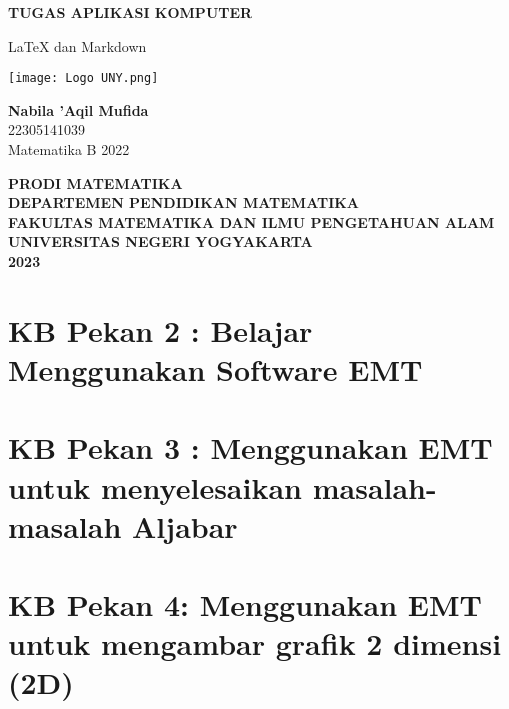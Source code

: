\documentclass{report}
\begin{document}
\begin{titlepage}
    \begin{center}
        \vspace*{0,2cm}

        \Huge
        \textbf{TUGAS APLIKASI KOMPUTER}
        
        \vspace{1cm}
        
        \LARGE
         LaTeX dan Markdown  
        
        \vspace{1cm}
        
        \texttt{[image: Logo UNY.png]}

        \vspace{1cm}
        
        \textbf{Nabila 'Aqil Mufida}\\
        22305141039\\
        Matematika B 2022
        
        \vspace{2cm}
        
        \Large
        \textbf{PRODI MATEMATIKA}\\
        \textbf{DEPARTEMEN PENDIDIKAN MATEMATIKA}\\
        \textbf{FAKULTAS MATEMATIKA DAN ILMU PENGETAHUAN ALAM}
        \textbf{UNIVERSITAS NEGERI YOGYAKARTA}\\
        \textbf{2023}
        
    \end{center}
\end{titlepage}

\newpage
\tableofcontents

\chapter{KB Pekan 2 : Belajar Menggunakan Software EMT}


\newpage
\chapter{KB Pekan 3 : Menggunakan EMT untuk menyelesaikan masalah-masalah Aljabar}


\newpage
\chapter{KB Pekan 4: Menggunakan EMT untuk mengambar grafik 2 dimensi (2D)}

\end{document}
